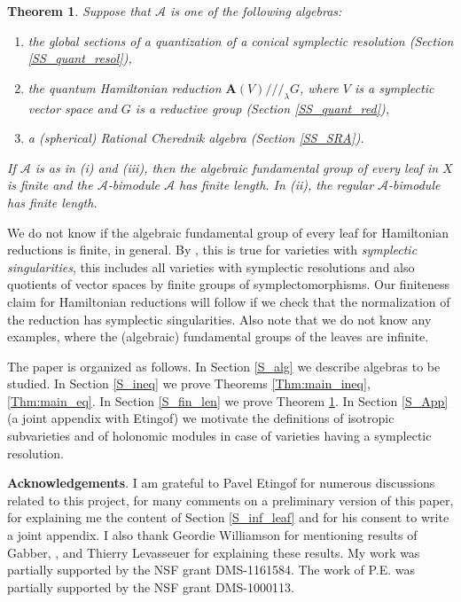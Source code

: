\documentclass[12pt]{amsart}
\newcommand{\A}{\mathcal{A}}
\newcommand{\Weyl}{\mathbf{A}}
\newcommand{\red}{/\!/\!/}
\newtheorem{Thm}{Theorem}[section]
\theoremstyle{definition}
\begin{document}
\begin{Thm}\label{Thm:fin_length}
Suppose that $\A$ is one of the following algebras:
\begin{enumerate}
\item[(i)] the global sections of a quantization of a conical symplectic resolution (Section \ref{SS_quant_resol}),
\item[(ii)] the quantum Hamiltonian reduction $\Weyl(V)\red_\lambda G$, where $V$
is a symplectic vector space and $G$ is a reductive group (Section \ref{SS_quant_red}),
\item[(iii)] a (spherical) Rational Cherednik algebra (Section \ref{SS_SRA}).
\end{enumerate}
If $\A$ is as in (i) and (iii), then the algebraic
fundamental group of every leaf in $X$ is finite and the $\A$-bimodule $\A$
has finite length. In (ii), the regular $\A$-bimodule has finite length.
\end{Thm}

We do not know if the algebraic fundamental group of every leaf for Hamiltonian reductions is finite, in general.
By \cite{Namikawa_fund}, this is true for varieties with {\it symplectic singularities},
this includes all varieties with symplectic resolutions and also quotients of vector spaces
by finite groups of symplectomorphisms. Our finiteness claim for Hamiltonian reductions will
follow if we check that the normalization of the reduction has symplectic singularities.
Also note that we do not know any examples, where the (algebraic) fundamental groups of the leaves
are infinite.

The paper is organized as follows. In Section \ref{S_alg} we describe algebras to be studied.
In Section \ref{S_ineq} we prove Theorems \ref{Thm:main_ineq},\ref{Thm:main_eq}. In Section
\ref{S_fin_len} we prove Theorem \ref{Thm:fin_length}. In Section \ref{S_App}
(a joint appendix with Etingof) we motivate the definitions of isotropic subvarieties
and of holonomic modules in case of varieties having a symplectic resolution.

{\bf Acknowledgements}. I am  grateful to Pavel Etingof for numerous discussions related to this project,
for many comments on a preliminary version of this paper, for  explaining me the content of
Section \ref{S_inf_leaf} and for his consent to write a joint appendix. I also thank Geordie Williamson
for mentioning results of Gabber, \cite{Gabber_equi},  and Thierry Levasseuer for
explaining these results.  My work
was partially supported by the NSF grant DMS-1161584. The work of P.E. was partially supported
by the NSF grant DMS-1000113.
\end{document}
